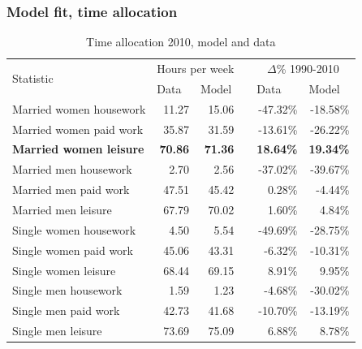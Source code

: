 \documentclass{beamer}
\begin{document}
\begin{frame}
	\frametitle{Model fit, time allocation}
	\scriptsize
	\begin{table}[htbp]
		\centering
		\caption{Time allocation 2010, model and data}
			\begin{tabular}{lrrrrr}
				\toprule
				\multirow{2}[4]{*}{Statistic} & \multicolumn{2}{c}{Hours per week} &       & \multicolumn{2}{c}{$\Delta$\% 1990-2010} \\
				\cmidrule{2-3}\cmidrule{5-6}      & \multicolumn{1}{l}{Data} & \multicolumn{1}{l}{Model} &       & \multicolumn{1}{l}{Data} & \multicolumn{1}{l}{Model} \\
				\midrule
				Married women housework & 11.27 & 15.06 &       & -47.32\% & -18.58\% \\
				Married women paid work & 35.87 & 31.59 &       & -13.61\% & -26.22\% \\
				\textcolor[rgb]{ 1,  0,  0}{\textbf{Married women leisure}} & \textcolor[rgb]{ 1,  0,  0}{\textbf{70.86}} & \textcolor[rgb]{ 1,  0,  0}{\textbf{71.36}} & \textcolor[rgb]{ 1,  0,  0}{} & \textcolor[rgb]{ 1,  0,  0}{\textbf{18.64\%}} & \textcolor[rgb]{ 1,  0,  0}{\textbf{19.34\%}} \\
				Married men housework & 2.70  & 2.56  &       & -37.02\% & -39.67\% \\
				Married men paid work & 47.51 & 45.42 &       & 0.28\% & -4.44\% \\
				Married men leisure & 67.79 & 70.02 &       & 1.60\% & 4.84\% \\
				Single women housework & 4.50  & 5.54  &       & -49.69\% & -28.75\% \\
				Single women paid work & 45.06 & 43.31 &       & -6.32\% & -10.31\% \\
				Single women leisure & 68.44 & 69.15 &       & 8.91\% & 9.95\% \\
				Single men housework & 1.59  & 1.23  &       & -4.68\% & -30.02\% \\
				Single men paid work & 42.73 & 41.68 &       & -10.70\% & -13.19\% \\
				Single men leisure & 73.69 & 75.09 &       & 6.88\% & 8.78\% \\
				\bottomrule
				\bottomrule
			\end{tabular}
	\end{table}
\end{frame}
\end{document}

